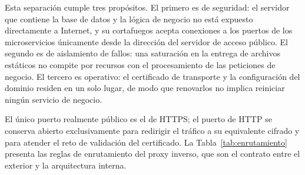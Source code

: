 	Esta separación cumple tres propósitos. El primero es de seguridad: el servidor que contiene la
	base de datos y la lógica de negocio no está expuesto directamente a Internet, y su cortafuegos
	acepta conexiones a los puertos de los microservicios únicamente desde la dirección del servidor
	de acceso público. El segundo es de aislamiento de fallos: una saturación en la entrega de
	archivos estáticos no compite por recursos con el procesamiento de las peticiones de negocio.
	El tercero es operativo: el certificado de transporte y la configuración del dominio residen en
	un solo lugar, de modo que renovarlos no implica reiniciar ningún servicio de negocio.
	
	El único puerto realmente público es el de HTTPS; el puerto de HTTP se conserva abierto
	exclusivamente para redirigir el tráfico a su equivalente cifrado y para atender el reto de
	validación del certificado. La Tabla~\ref{tab:enrutamiento} presenta las reglas de enrutamiento
	del proxy inverso, que son el contrato entre el exterior y la arquitectura interna.
	
	\small
	\renewcommand{\arraystretch}{1.2}
	
